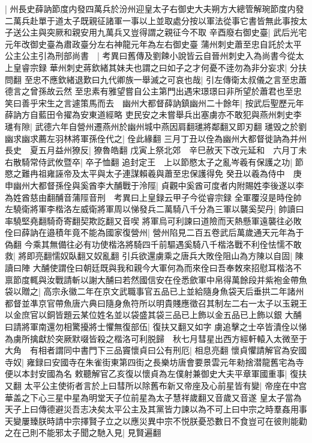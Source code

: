 |{
	州長史薛訥節度内發四萬兵於汾州迎皇太子右御史大夫朔方大總管解琬節度内發二萬兵赴單于道太子既親征諸軍一事以上並取處分按以軍法從事它書皆無此事按太子送公主與突厥和親安用九萬兵又豈得謂之親征今不取}
辛酉廢右御史臺|{
	武后光宅元年改御史臺為肅政臺分左右神龍元年為左右御史臺}
蒲州刺史蕭至忠自託於太平公主公主引為刑部尚書　|{
	考異曰舊傳及劉餗小說皆云自晉州刺史入為尚書今從太上皇睿宗録}
華州刺史蔣欽緒其妹夫也謂之曰如子之才何憂不逹勿為非分妄求|{
	分扶問翻}
至忠不應欽緒退歎曰九代卿族一舉滅之可哀也哉|{
	引左傳衛太叔儀之言至忠蕭德言之曾孫故云然}
至忠素有雅望嘗自公主第門出遇宋璟璟曰非所望於蕭君也至忠笑曰善乎宋生之言遽策馬而去　幽州大都督薛訥鎮幽州二十餘年|{
	按武后聖歷元年薛訥方自藍田令擢為安東道經略}
吏民安之未嘗舉兵出塞虜亦不敢犯與燕州刺史李璡有隙|{
	武德六年自營州遷燕州於幽州城中燕因肩翻璡將鄰翻又即刃翻}
璡毁之於劉幽求幽求薦左羽林將軍孫佺代之|{
	佺此緣翻}
三月丁丑以佺為幽州大都督徙訥為并州長史　夏五月益州獠反|{
	獠魯皓翻}
戊寅上祭北郊　辛巳赦天下改元延和　六月丁未右散騎常侍武攸暨卒|{
	卒子恤翻}
追封定王　上以節愍太子之亂岑羲有保護之功|{
	節愍之難冉祖雍誣帝及太平與太子連謀賴羲與蕭至忠保護得免}
癸丑以羲為侍中　庚申幽州大都督孫佺與奚酋李大酺戰于泠陘|{
	貞觀中奚酋可度者内附賜姓李後遂以李為姓酋慈由翻酺音蒲陘音刑　考異曰上皇録云甲子今從睿宗録}
全軍覆沒是時佺帥左驍衛將軍李楷洛左威衛將軍周以悌發兵二萬騎八千分為三軍以襲奚契丹|{
	帥讀曰率驍堅堯翻騎奇寄翻契欺訖翻又音喫}
將軍烏可利諫曰道險而天熱懸軍遠襲往必敗佺曰薛訥在邉積年竟不能為國家復營州|{
	營州陷見二百五卷武后萬歲通天元年為于偽翻}
今乘其無備往必有功使楷洛將騎四千前驅遇奚騎八千楷洛戰不利佺怯懦不敢救|{
	將即亮翻懦奴臥翻又奴亂翻}
引兵欲還虜乘之唐兵大敗佺阻山為方陳以自固|{
	陳讀曰陣}
大酺使謂佺曰朝廷既與我和親今大軍何為而來佺曰吾奉敇來招慰耳楷洛不禀節度輒與汝戰請斬以謝大酺曰若然國信安在佺悉歛軍中帛得萬餘段并紫袍金帶魚袋以贈之|{
	高宗永徽二年在京文武職事官五品已上並給隨身魚袋天后垂拱二年諸州都督並凖京官帶魚唐六典曰隨身魚符所以明貴賤應徵召其制左二右一太子以玉親王以金庶官以銅皆題云某位姓名並以袋盛其袋三品已上飾以金五品已上飾以銀}
大酺曰請將軍南還勿相驚擾將士懼無復部伍|{
	復扶又翻又如字}
虜追擊之士卒皆潰佺以悌為虜所擒獻於突厥默啜皆殺之楷洛可利脱歸　秋七月彗星出西方經軒轅入太微至于大角　有相者謂同中書門下三品竇懷貞曰公有刑厄|{
	相息亮翻}
懷貞懼請解官為安國寺奴|{
	雍録曰安國寺在朱雀街東第四街之長樂坊唐會要景雲元年勑捨潜龍舊宅為寺便以本封安國為名}
敕聽解官乙亥復以懷貞為左僕射兼御史大夫平章軍國重事|{
	復扶又翻}
太平公主使術者言於上曰彗所以除舊布新又帝座及心前星皆有變|{
	帝座在中宫華盖之下心三星中星為明堂天子位前星為太子慧祥歲翻又音歲又音遂}
皇太子當為天子上曰傳德避災吾志决矣太平公主及其黨皆力諫以為不可上曰中宗之時羣姦用事天變屢臻朕時請中宗擇賢子立之以應災異中宗不悦朕憂恐數日不食豈可在彼則能勸之在己則不能邪太子聞之馳入見|{
	見賢遍翻}
